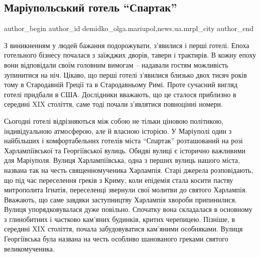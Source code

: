  
 
 
 
 
 
\subsection{Маріупольський готель \enquote{Спартак}}
\label{sec:02_03_2018.stz.news.ua.mrpl_city.1.gotel_spartak}
 
\ifcmt
 author_begin
   author_id demidko_olga.mariupol,news.ua.mrpl_city
 author_end
\fi


З виникненням у людей бажання подорожувати, з'явилися і перші готелі. Епоха
готельного бізнесу почалася з заїжджих дворів, таверн і трактирів. В кожну
епоху вони відповідали своїм головним вимогам – надавали гостям можливість
зупинитися на ніч. Цікаво, що перші готелі з'явилися близько двох тисяч років
тому в Стародавній Греції та в Стародавньому Римі. Проте сучасний вигляд
готелі придбали в США. Дослідники вважають, що це сталося приблизно в середині
XIX століття, саме тоді почали з'являтися повноцінні номери.


Сьогодні готелі відрізняються між собою не тільки ціновою політикою,
індивідуальною атмосферою, але й власною історією. У Маріуполі один з
найбільших і комфортабельних готелів міста \enquote{Спартак}  розташований на розі
Харлампіївської та Георгіївської вулиць. Обидві вулиці є історично важливими
для Маріуполя. Вулиця Харлампіївська, одна з перших вулиць нашого міста,
названа так на честь священномученика Харлампія. Старі джерела розповідають, що
під час переселення греків з Криму, коли епідемія стала косити паству
митрополита Ігнатія, переселенці звернули свої молитви до святого Харлампія.
Вважають, що саме завдяки заступництву Харлампія хвороби припинилися. Вулиця
упорядковувалася дуже повільно. Спочатку вона складалася в основному з
глинобитних і частково кам'яних будинків, критих черепицею. Пізніше, в середині
XIX століття, почала забудовуватися кам'яними особняками. Вулиця Георгіївська
була названа на честь особливо шанованого греками святого великомученика.

